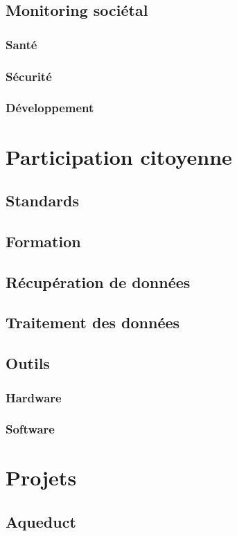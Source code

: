 \documentclass[10pt, conference, compsocconf]{llncs}
\begin{document}
\subsection{Monitoring sociétal}
\subsubsection{Santé}
\subsubsection{Sécurité}
\subsubsection{Développement}

\section{Participation citoyenne}
\subsection{Standards}
\subsection{Formation}
\subsection{Récupération de données}
\subsection{Traitement des données}
\subsection{Outils}
\subsubsection{Hardware}
\subsubsection{Software}	

\section{Projets}
\subsection{Aqueduct}
\end{document}
